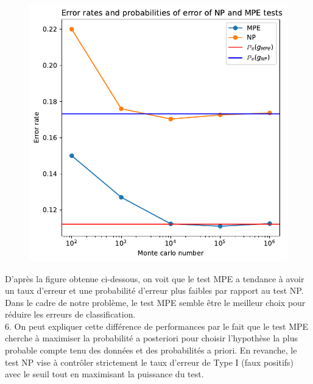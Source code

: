 \documentclass[12pt,a4paper]{article}
\begin{document}
\begin{figure}[h!]
	\centering
	\includegraphics{Error_rate.pdf}
\end{figure}

D'après la figure obtenue ci-dessous, on voit que le test MPE a tendance à avoir un taux d'erreur et une probabilité d'erreur plus faibles par rapport au test NP. Dans le cadre de notre problème, le test MPE semble être le meilleur choix pour réduire les erreurs de classification.\\

6. On peut expliquer cette différence de performances par le fait que le test MPE cherche à maximiser la probabilité a posteriori pour choisir l'hypothèse la plus probable compte tenu des données et des probabilités a priori. En revanche, le test NP vise à contrôler strictement le taux d'erreur de Type I (faux positifs) avec le seuil tout en maximisant la puissance du test.
\end{document}
